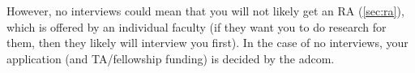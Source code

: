 \documentclass[oneside,11pt,dvipsnames]{book}
\begin{document}
However, no interviews could mean that you will not likely get an RA (\autoref{sec:ra}), which is offered by an individual faculty (if they want you to do research for them, then they likely will interview you first).  In the case of no interviews, your application (and TA/fellowship funding) is decided by the adcom.












%
\end{document}

